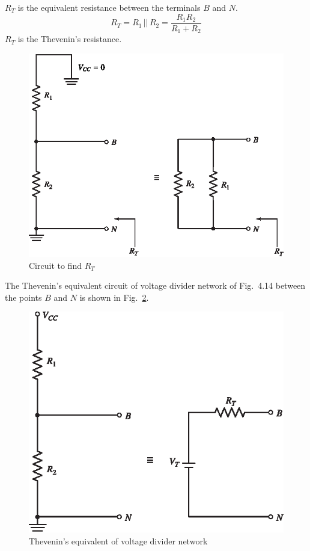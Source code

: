 $R_{T}$ is the equivalent resistance between the terminals $B$ and $N$.
\begin{equation}
R_{T}=R_{1} \,||\, R_{2}=\frac{R_{1}R_{2}}{R_{1}+R_{2}}\label{eq4.27}
\end{equation}
$R_{T}$ is the Thevenin's resistance.
\setcounter{figure}{14}
\begin{figure}[H]
\centering
\includegraphics{chap3/S3-EE-03-048.eps}
\caption{Circuit to find $R_{T}$}\label{fig4.15}
\end{figure}

The Thevenin's equivalent circuit of voltage divider network of Fig.~4.14 between the points $B$ and $N$ is shown in Fig.~\ref{fig4.16}.
\begin{figure}[H]
\centering
\includegraphics{chap3/S3-EE-03-049.eps}
\caption{Thevenin's equivalent of voltage divider network}\label{fig4.16}
\end{figure}

